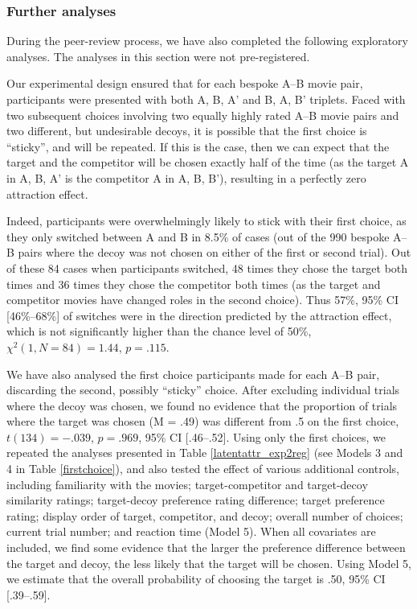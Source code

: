 \documentclass[12pt, a4paper]{article}
\begin{document}
\subsubsection*{Further analyses}

During the peer-review process, we have also completed the following exploratory analyses. The analyses in this section were not pre-registered.

Our experimental design ensured that for each bespoke A--B movie pair, participants were presented with both A, B, A' and B, A, B' triplets. Faced with two subsequent choices involving two equally highly rated A--B movie pairs and two different, but undesirable decoys, it is possible that the first choice is  ``sticky'', and will be repeated. If this is the case, then we can expect that the target and the competitor will be chosen exactly half of the time (as the target A in A, B, A' is the competitor A in A, B, B'), resulting in a perfectly zero attraction effect. 

Indeed, participants were overwhelmingly likely to stick with their first choice, as they only switched between A and B in 8.5\% of cases (out of the 990 bespoke A--B pairs where the decoy was not chosen on either of the first or second trial). Out of these 84 cases when participants switched, 48 times they chose the target both times and 36 times they chose the competitor both times (as the target and competitor movies have changed roles in the second choice). Thus 57\%, 95\% CI [46\%--68\%] of switches were in the direction predicted by the attraction effect, which is not significantly higher than the chance level of 50\%, ${\chi}^2(1, N = 84)=1.44$, $p=.115$. 

We have also analysed the first choice participants made for each A--B pair, discarding the second, possibly ``sticky'' choice.  
After excluding individual trials where the decoy was chosen, we found no evidence that the proportion of trials where the target was chosen (M = .49) was different from .5 on the first choice, $t(134)=-.039$, $p=.969$, 95\% CI [.46--.52]. Using only the first choices, we repeated the analyses presented in Table \ref{latentattr_exp2reg} (see Models 3 and 4 in Table \ref{firstchoice}), and also tested the effect of various additional controls, including familiarity with the movies; target-competitor and target-decoy similarity ratings; target-decoy preference rating difference; target preference rating; display order of target, competitor, and decoy; overall number of choices; current trial number; and reaction time (Model 5). When all covariates are included, we find some evidence that the larger the preference difference between the target and decoy, the less likely that the target will be chosen. Using Model 5, we estimate that the overall probability of choosing the target is .50, 95\% CI [.39--.59]. 
\end{document}
